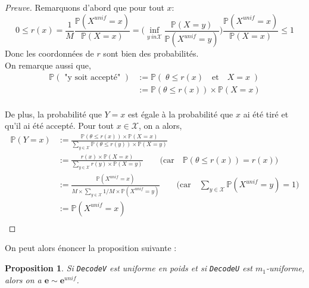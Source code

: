 \documentclass[12pt]{article}
\theoremstyle{plain}
\newtheorem{propo}[thm]{Proposition}
\theoremstyle{definition}
\begin{document}
\begin{proof}[Preuve] Remarquons d'abord que pour tout $x$:
$$0 \leq r(x) = \frac{1}{M}\frac{\mathbb{P}(X^{unif}=x)}{\mathbb{P}(X=x)} = \Bigg(\inf_{y \ in \mathcal{X}}\frac{\mathbb{P}(X=y)}{\mathbb{P}(X^{unif}=y)}\Bigg)\frac{\mathbb{P}(X^{unif}=x)}{\mathbb{P}(X=x)}\leq 1$$
Donc les coordonnées de $r$ sont bien des probabilités.\\

\noindent On remarque aussi que,
\begin{equation*}
   \begin{split}
    \mathbb{P}(\text{ "y soit accepté" }) &:= \mathbb{P}(\; \theta \leq r(x)\quad \text{et} \quad X=x\;) \\[0.6cm]
    &:=  \mathbb{P}(\theta \leq r(x)) \times\mathbb{P}(X=x) \\[0.6cm]
    \end{split}
\end{equation*}

De plus, la probabilité que $Y = x$ est égale à la probabilité que $x$ ai été tiré et qu'il ai été accepté. 
\noindent Pour tout $x \in \mathcal{X}$, on a alors,
\begin{equation*}
   \begin{split}
    \mathbb{P}(Y=x) &:= \frac{ \mathbb{P}(\theta \leq r(x)) \times\mathbb{P}(X=x)}{\sum_{y \in \mathcal{X}} \mathbb{P}(\theta \leq r(y)) \times\mathbb{P}(X=y)} \\[0.6cm]
    &:=\frac{  r(x) \times\mathbb{P}(X=x)}{\sum_{y \in \mathcal{X}}  r(y) \times\mathbb{P}(X=y)}\qquad \Big(\text{car}\quad \mathbb{P}(\theta \leq r(x)) =  r(x)\Big)\\[0.6cm]
    &:=\frac{ \mathbb{P}(X^{unif}=x)}{M\times\sum_{y \in \mathcal{X}} 1/M \times\mathbb{P}(X^{unif}=y)}\qquad \Big(\text{car}\quad \sum_{y\in \mathcal{X}}\mathbb{P}(X^{unif}=y) = 1\Big)\\[0.6cm]
    &:= \mathbb{P}(X^{unif}=x) \\[0.6cm]
    \end{split}
\end{equation*}

\end{proof}



\noindent On peut alors énoncer la proposition suivante :


\begin{propo}
Si \verb|DecodeV| est uniforme en poids et si \verb|DecodeU| est $m_1$-uniforme, alors on a $\mathbf{e}\sim\mathbf{e}^{unif}$.
\end{propo}
\end{document}
